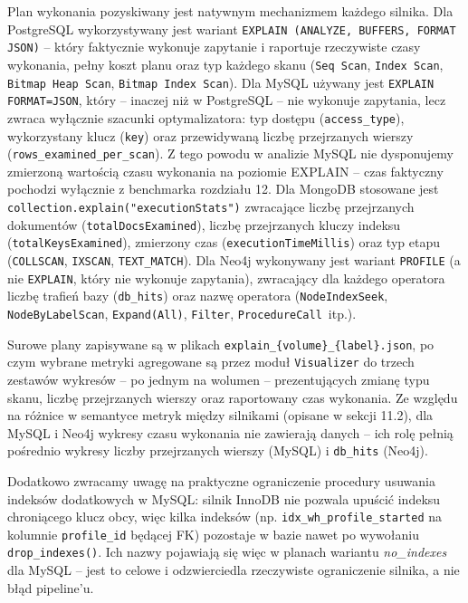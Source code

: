 Plan wykonania pozyskiwany jest natywnym mechanizmem każdego silnika.
Dla PostgreSQL wykorzystywany jest wariant
\texttt{EXPLAIN (ANALYZE, BUFFERS, FORMAT JSON)} -- który faktycznie
wykonuje zapytanie i raportuje rzeczywiste czasy wykonania, pełny koszt planu oraz typ każdego skanu
(\texttt{Seq Scan}, \texttt{Index Scan}, \texttt{Bitmap Heap Scan},
\texttt{Bitmap Index Scan}). Dla MySQL używany jest
\texttt{EXPLAIN FORMAT=JSON}, który -- inaczej niż w PostgreSQL --
nie wykonuje zapytania, lecz zwraca wyłącznie szacunki optymalizatora:
typ dostępu (\texttt{access\_type}), wykorzystany klucz (\texttt{key})
oraz przewidywaną liczbę przejrzanych wierszy
(\texttt{rows\_examined\_per\_scan}). Z tego powodu w analizie MySQL
nie dysponujemy zmierzoną wartością czasu wykonania na poziomie
EXPLAIN -- czas faktyczny pochodzi wyłącznie z benchmarka rozdziału 12.
Dla MongoDB stosowane jest \texttt{collection.explain("executionStats")}
zwracające liczbę przejrzanych dokumentów (\texttt{totalDocsExamined}),
liczbę przejrzanych kluczy indeksu (\texttt{totalKeysExamined}),
zmierzony czas (\texttt{executionTimeMillis}) oraz typ etapu
(\texttt{COLLSCAN}, \texttt{IXSCAN}, \texttt{TEXT\_MATCH}). Dla Neo4j
wykonywany jest wariant \texttt{PROFILE} (a nie \texttt{EXPLAIN}, który
nie wykonuje zapytania), zwracający dla każdego operatora liczbę
trafień bazy (\texttt{db\_hits}) oraz nazwę operatora
(\texttt{NodeIndexSeek}, \texttt{NodeByLabelScan}, \texttt{Expand(All)},
\texttt{Filter}, \texttt{ProcedureCall}~itp.).

Surowe plany zapisywane są w plikach \texttt{explain\_\{volume\}\_\{label\}.json},
po czym wybrane metryki agregowane są przez moduł \texttt{Visualizer}
do trzech zestawów wykresów -- po jednym na wolumen -- prezentujących
zmianę typu skanu, liczbę przejrzanych wierszy oraz raportowany czas
wykonania. Ze względu na różnice w semantyce metryk między silnikami
(opisane w sekcji 11.2), dla MySQL i Neo4j wykresy czasu wykonania
nie zawierają danych -- ich rolę pełnią pośrednio wykresy liczby
przejrzanych wierszy (MySQL) i \texttt{db\_hits} (Neo4j).

Dodatkowo zwracamy uwagę na praktyczne ograniczenie procedury usuwania
indeksów dodatkowych w MySQL: silnik InnoDB nie pozwala upuścić indeksu
chroniącego klucz obcy, więc kilka indeksów (np.
\texttt{idx\_wh\_profile\_started} na kolumnie \texttt{profile\_id}
będącej FK) pozostaje w bazie nawet po wywołaniu \texttt{drop\_indexes()}.
Ich nazwy pojawiają się więc w planach wariantu \emph{no\_indexes} dla
MySQL -- jest to celowe i odzwierciedla rzeczywiste ograniczenie
silnika, a nie błąd pipeline'u.

